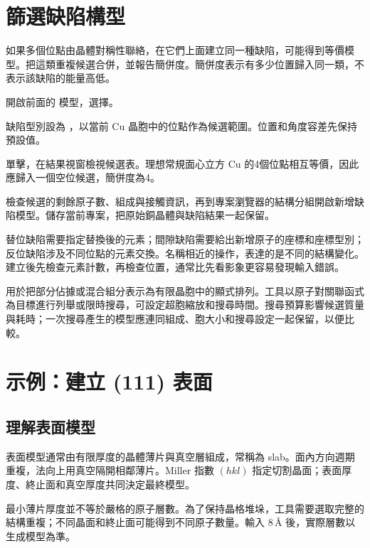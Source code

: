 \section{篩選缺陷構型}

如果多個位點由晶體對稱性聯絡，在它們上面建立同一種缺陷，可能得到等價模型。把這類重複候選合併，並報告簡併度。簡併度表示有多少位置歸入同一類，不表示該缺陷的能量高低。

\begin{steps}
  \item 開啟前面的  模型，選擇。
  \item 缺陷型別設為 ，以當前 Cu 晶胞中的位點作為候選範圍。位置和角度容差先保持預設值。
  \item 單擊，在結果視窗檢視候選表。理想常規面心立方 Cu 的4個位點相互等價，因此應歸入一個空位候選，簡併度為4。
  \item 檢查候選的剩餘原子數、組成與接觸資訊，再到專案瀏覽器的結構分組開啟新增缺陷模型。儲存當前專案，把原始銅晶體與缺陷結果一起保留。
\end{steps}

替位缺陷需要指定替換後的元素；間隙缺陷需要給出新增原子的座標和座標型別；反位缺陷涉及不同位點的元素交換。名稱相近的操作，表達的是不同的結構變化。建立後先檢查元素計數，再檢查位置，通常比先看影象更容易發現輸入錯誤。

用於把部分佔據或混合組分表示為有限晶胞中的顯式排列。工具以原子對關聯函式為目標進行列舉或限時搜尋，可設定超胞縮放和搜尋時間。搜尋預算影響候選質量與耗時；一次搜尋產生的模型應連同組成、胞大小和搜尋設定一起保留，以便比較。

\section{示例：建立 (111) 表面}

\subsection{理解表面模型}

表面模型通常由有限厚度的晶體薄片與真空層組成，常稱為 slab。面內方向週期重複，法向上用真空隔開相鄰薄片。Miller 指數 $(hkl)$ 指定切割晶面；表面厚度、終止面和真空厚度共同決定最終模型。



最小薄片厚度並不等於嚴格的原子層數。為了保持晶格堆垛，工具需要選取完整的結構重複；不同晶面和終止面可能得到不同原子數量。輸入 $8\,\text{\AA}$ 後，實際層數以生成模型為準。


